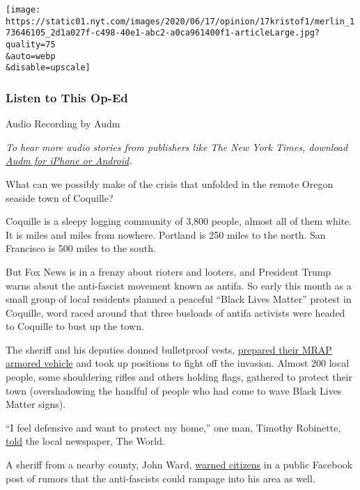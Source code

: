 \texttt{[image: https://static01.nyt.com/images/2020/06/17/opinion/17kristof1/merlin\_173646105\_2d1a027f-c498-40e1-abc2-a0ca961400f1-articleLarge.jpg?quality=75\\\&auto=webp\\\&disable=upscale]}

\hypertarget{listen-to-this-op-ed}{%
\subsubsection{Listen to This Op-Ed}\label{listen-to-this-op-ed}}

Audio Recording by Audm

\emph{To hear more audio stories from publishers like The New York
Times, download}
\href{https://www.audm.com/?utm_source=nytopinion\&utm_medium=embed\&utm_campaign=antifa_hysteria_america}{\emph{Audm
for iPhone or Android}}\emph{.}

What can we possibly make of the crisis that unfolded in the remote
Oregon seaside town of Coquille?

Coquille is a sleepy logging community of 3,800 people, almost all of
them white. It is miles and miles from nowhere. Portland is 250 miles to
the north. San Francisco is 500 miles to the south.

But Fox News is in a frenzy about rioters and looters, and President
Trump warns about the anti-fascist movement known as antifa. So early
this month as a small group of local residents planned a peaceful
``Black Lives Matter'' protest in Coquille, word raced around that three
busloads of antifa activists were headed to Coquille to bust up the
town.

The sheriff and his deputies donned bulletproof vests,
\href{https://theworldlink.com/news/local/photo-gallery-hundreds-turn-out-over-rumored-riot/collection_71a9dfac-a562-11ea-b81d-1f2184b2b90b.html\#11}{prepared
their MRAP armored vehicle} and took up positions to fight off the
invasion. Almost 200 local people, some shouldering rifles and others
holding flags, gathered to protect their town (overshadowing the handful
of people who had come to wave Black Lives Matter signs).

``I feel defensive and want to protect my home,'' one man, Timothy
Robinette,
\href{https://theworldlink.com/news/local/hundreds-turn-out-to-stop-rumored-riot/article_b58d6386-a59b-11ea-90f0-7f3504c58c5d.html}{told}
the local newspaper, The World.

A sheriff from a nearby county, John Ward,
\href{https://ktvl.com/news/local/not-a-call-to-arms-curry-county-sheriff-explains-facebook-post-on-rumored-antifa-bus}{warned
citizens} in a public Facebook post of rumors that the anti-fascists
could rampage into his area as well.

